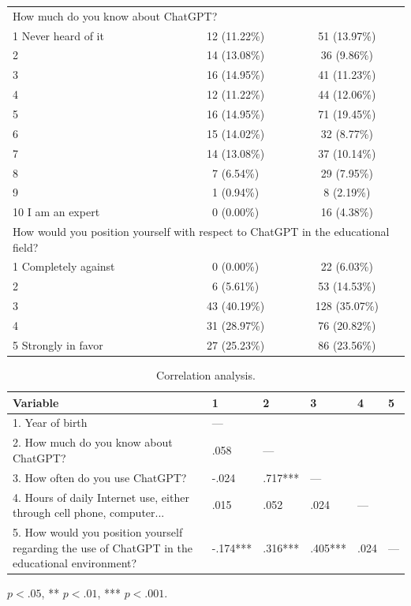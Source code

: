 \documentclass[english]{textolivre}
\begin{document}
\begin{table}[htbp]
\begin{tabular}{lcc}
\multicolumn{3}{l}{How much do you know about ChatGPT?} \\
1 Never heard of it & 12 (11.22\%) & 51 (13.97\%) \\
2 & 14 (13.08\%) & 36 (9.86\%) \\
3 & 16 (14.95\%) & 41 (11.23\%) \\
4 & 12 (11.22\%) & 44 (12.06\%) \\
5 & 16 (14.95\%) & 71 (19.45\%) \\
6 & 15 (14.02\%) & 32 (8.77\%) \\
7 & 14 (13.08\%) & 37 (10.14\%) \\
8 & 7 (6.54\%) & 29 (7.95\%) \\
9 & 1 (0.94\%) & 8 (2.19\%) \\
10 I am an expert & 0 (0.00\%) & 16 (4.38\%) \\
\midrule

\multicolumn{3}{l}{How would you position yourself with respect to ChatGPT in the educational field?} \\
1 Completely against & 0 (0.00\%) & 22 (6.03\%) \\
2 & 6 (5.61\%) & 53 (14.53\%) \\
3 & 43 (40.19\%) & 128 (35.07\%) \\
4 & 31 (28.97\%) & 76 (20.82\%) \\
5 Strongly in favor & 27 (25.23\%) & 86 (23.56\%) \\
\bottomrule
\end{tabular}
\end{table}

\newpage
\begin{table}[h]
\centering
\small
\begin{threeparttable}
\caption{Correlation analysis.}
\label{tab:correlation}
\begin{tabular}{p{4cm} p{} p{} p{} p{} p{}}
\toprule
Variable & 1 & 2 & 3 & 4 & 5 \\
\midrule

1. Year of birth
& --- & & & & \\

2. How much do you know about ChatGPT?
& .058 & --- & & & \\

3. How often do you use ChatGPT?
& -.024 & .717*** & --- & & \\

4. Hours of daily Internet use, either through cell phone, computer...
& .015 & .052 & .024 & --- & \\

5. How would you position yourself regarding the use of ChatGPT in the educational environment?
& -.174*** & .316*** & .405*** & .024 & --- \\

\bottomrule
\end{tabular}
\begin{tablenotes}
\item * $p < .05$, ** $p < .01$, *** $p < .001$.
\end{tablenotes}
\end{threeparttable}
\end{table}
\end{document}
